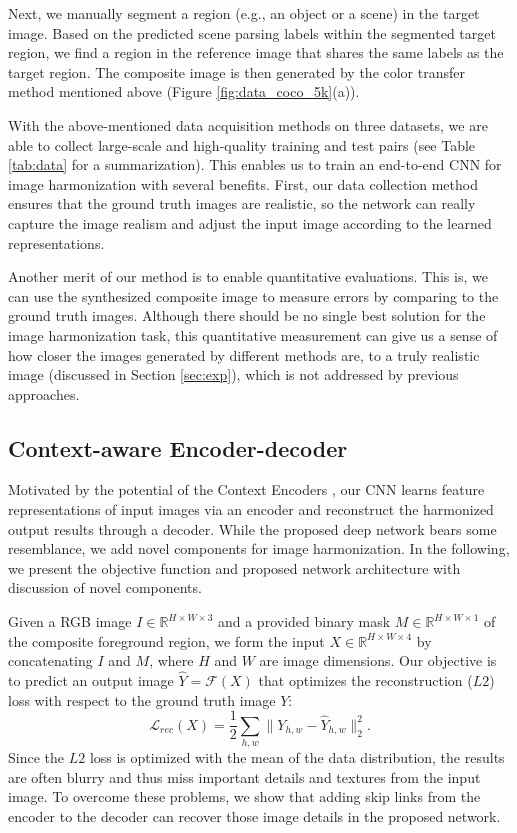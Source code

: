 \documentclass[10pt,twocolumn,letterpaper]{article}
\begin{document}
Next, we manually segment a region (e.g., an object or a scene) in the target image.
%
Based on the predicted scene parsing labels within the segmented target region, we find a region in the reference image that shares the same labels as the target region.
%
The composite image is then generated by the color transfer method mentioned above (Figure \ref{fig:data_coco_5k}(a)).
%

{}
With the above-mentioned data acquisition methods on three datasets, we are able to collect large-scale and high-quality training and test pairs (see Table \ref{tab:data} for a summarization).
%
This enables us to train an end-to-end CNN for image harmonization with several benefits.
%
First, our data collection method ensures that the ground truth images are realistic, so the network can really capture the image realism and adjust the input image according to the learned representations.
%

Another merit of our method is to enable quantitative evaluations.
%
This is, we can use the synthesized composite image to measure errors by comparing to the ground truth images.
%
Although there should be no single best solution for the image harmonization task, this quantitative measurement can give us a sense of how closer the images generated by different methods are, to a truly realistic image (discussed in Section \ref{sec:exp}), which is not addressed by previous approaches.

\subsection{Context-aware Encoder-decoder}
%
Motivated by the potential of the Context Encoders \cite{Pathak_CVPR_2016}, 
our CNN learns feature representations of input images via an encoder and reconstruct the harmonized output results through a decoder.
%
While the proposed deep network bears some resemblance, we add novel components for image harmonization. 
%
In the following, we present the objective function and  
proposed network architecture with discussion of novel components.
%

{}
%
Given a RGB image $I \in \mathbb{R}^{H \times W \times 3}$ and a provided binary mask $M \in \mathbb{R}^{H \times W \times 1}$ of the composite foreground region, we form the input $X \in \mathbb{R}^{H \times W \times 4}$ by concatenating $I$ and $M$, where $H$ and $W$ are image dimensions.
%
Our objective is to predict an output image $\hat{Y} = \mathcal{F}(X)$ that optimizes the reconstruction ($L2$) loss with respect to the ground truth image $Y$:
%
\begin{equation}
\mathcal{L}_{rec}(X) = \frac{1}{2}\sum_{h,w}\parallel Y_{h,w} - \hat{Y}_{h,w} \parallel_2^2.
\label{eq:l2}
\end{equation}
%
Since the $L2$ loss is optimized with the mean of the data distribution, the results 
are often blurry and thus miss important details and textures from the input image.
%
To overcome these problems, we show that adding skip links 
from the encoder to the decoder can recover those image details in the proposed network. 
\end{document}
